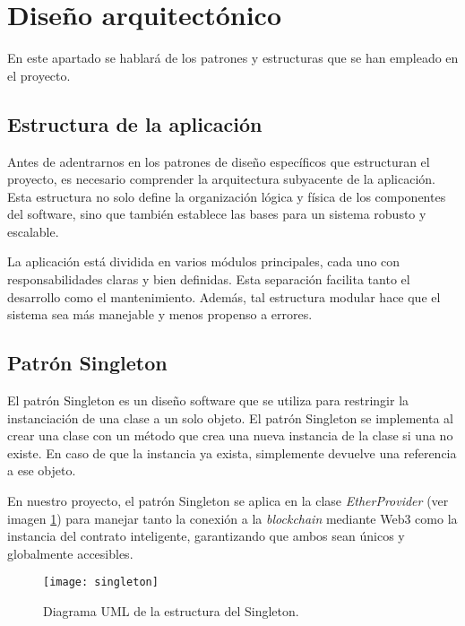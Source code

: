 

\section{Diseño arquitectónico}

En este apartado se hablará de los patrones y estructuras que se han empleado en el proyecto.

\subsection{Estructura de la aplicación}

Antes de adentrarnos en los patrones de diseño específicos que estructuran el proyecto, es necesario comprender la arquitectura subyacente de la aplicación. 
Esta estructura no solo define la organización lógica y física de los componentes del software, sino que también establece las bases para un sistema robusto y escalable.

La aplicación está dividida en varios módulos principales, cada uno con responsabilidades claras y bien definidas. Esta separación facilita tanto el desarrollo como el mantenimiento. Además, tal estructura modular hace que el sistema sea más manejable y menos propenso a errores.

\subsection{Patrón Singleton}

El patrón Singleton es un diseño software que se utiliza para restringir la instanciación de una clase a un solo objeto. El patrón Singleton se implementa al crear una clase con un método que crea una nueva instancia de la clase si una no existe. En caso de que la instancia ya exista, simplemente devuelve una referencia a ese objeto.

En nuestro proyecto, el patrón Singleton se aplica en la clase \textit{EtherProvider} (ver imagen \ref{img:singleton}) para manejar tanto la conexión a la \textit{blockchain} mediante Web3 como la instancia del contrato inteligente, garantizando que ambos sean únicos y globalmente accesibles.

\begin{figure}[h]
	\label{img:singleton}
	\centering
	\texttt{[image: singleton]}
	\caption[Diagrama Singleton]{Diagrama UML de la estructura del Singleton.}
\end{figure}


